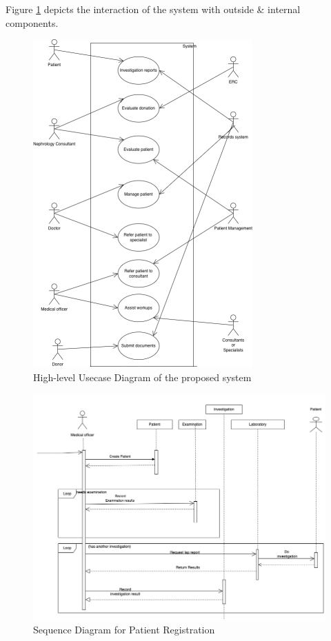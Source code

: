 \documentclass[12pt,a4paper]{report}
\begin{document}
Figure \ref{fig:usecase} depicts the interaction of the system with outside \& internal components. 
 \begin{figure}[hbp]
\begin{center}
\includegraphics[width=0.75\textwidth]{images/high-level-usecase.png}	
\end{center}
\caption{High-level Usecase Diagram of the proposed system}
\label{fig:usecase}
\end{figure}


 

 
 
\newpage


 \begin{figure}[hbp]
\begin{center}
\includegraphics[width=\textwidth]{images/patient-registration.png}	
\end{center}
\caption{Sequence Diagram for Patient Registration}
\label{fig:patient-registration}
\end{figure}
\end{document}
